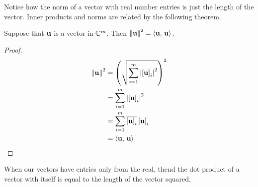 \documentclass{ximera}
\begin{document}
Notice how the norm of a vector with real number entries is just the
length of the vector.  Inner products and norms are related by the
following theorem.

\begin{theorem}
\label{theorem:IPN}

Suppose that $\mathbf{u}$ is a vector in $\mathbb{C}^{m}$.  Then
$\left\lVert\mathbf{u}\right\rVert^2=\left\langle\mathbf{u},\,\mathbf{u}\right\rangle$.

\begin{proof}

  \begin{align*}
    \left\lVert\mathbf{u}\right\rVert^2 &= \left(\sqrt{\sum_{i=1}^{m}\left\lvert\left\lbrack\mathbf{u}\right\rbrack_{i}\right\rvert^2}\right)^2 \\ 
    &=\sum_{i=1}^{m}\left\lvert\left\lbrack\mathbf{u}\right\rbrack_{i}\right\rvert^2 \\ 
    &=\sum_{i=1}^{m}\overline{\left\lbrack\mathbf{u}\right\rbrack_{i}}\left\lbrack\mathbf{u}\right\rbrack_{i} \\ 
    &=\left\langle\mathbf{u},\,\mathbf{u}\right\rangle \\ 
  \end{align*}

\end{proof}
\end{theorem}

When our vectors have entries only from the real, thend the dot
product of a vector with itself is equal to the length of the vector
squared.
\end{document}
